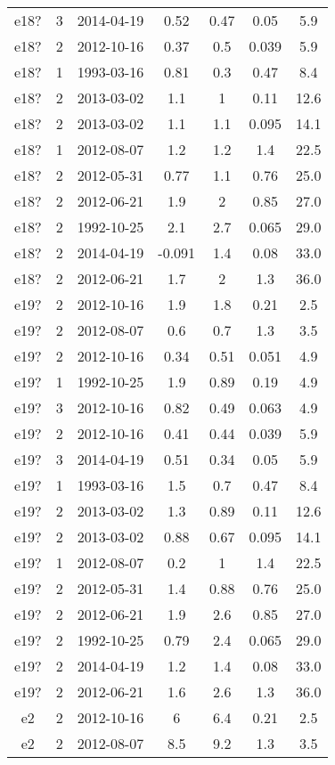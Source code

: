 \begin{table*}[htp]
\begin{tabular}{ccccccc}
e18? & 3 & 2014-04-19 & 0.52 & 0.47 & 0.05 & 5.9 \\
e18? & 2 & 2012-10-16 & 0.37 & 0.5 & 0.039 & 5.9 \\
e18? & 1 & 1993-03-16 & 0.81 & 0.3 & 0.47 & 8.4 \\
e18? & 2 & 2013-03-02 & 1.1 & 1 & 0.11 & 12.6 \\
e18? & 2 & 2013-03-02 & 1.1 & 1.1 & 0.095 & 14.1 \\
e18? & 1 & 2012-08-07 & 1.2 & 1.2 & 1.4 & 22.5 \\
e18? & 2 & 2012-05-31 & 0.77 & 1.1 & 0.76 & 25.0 \\
e18? & 2 & 2012-06-21 & 1.9 & 2 & 0.85 & 27.0 \\
e18? & 2 & 1992-10-25 & 2.1 & 2.7 & 0.065 & 29.0 \\
e18? & 2 & 2014-04-19 & -0.091 & 1.4 & 0.08 & 33.0 \\
e18? & 2 & 2012-06-21 & 1.7 & 2 & 1.3 & 36.0 \\
e19? & 2 & 2012-10-16 & 1.9 & 1.8 & 0.21 & 2.5 \\
e19? & 2 & 2012-08-07 & 0.6 & 0.7 & 1.3 & 3.5 \\
e19? & 2 & 2012-10-16 & 0.34 & 0.51 & 0.051 & 4.9 \\
e19? & 1 & 1992-10-25 & 1.9 & 0.89 & 0.19 & 4.9 \\
e19? & 3 & 2012-10-16 & 0.82 & 0.49 & 0.063 & 4.9 \\
e19? & 2 & 2012-10-16 & 0.41 & 0.44 & 0.039 & 5.9 \\
e19? & 3 & 2014-04-19 & 0.51 & 0.34 & 0.05 & 5.9 \\
e19? & 1 & 1993-03-16 & 1.5 & 0.7 & 0.47 & 8.4 \\
e19? & 2 & 2013-03-02 & 1.3 & 0.89 & 0.11 & 12.6 \\
e19? & 2 & 2013-03-02 & 0.88 & 0.67 & 0.095 & 14.1 \\
e19? & 1 & 2012-08-07 & 0.2 & 1 & 1.4 & 22.5 \\
e19? & 2 & 2012-05-31 & 1.4 & 0.88 & 0.76 & 25.0 \\
e19? & 2 & 2012-06-21 & 1.9 & 2.6 & 0.85 & 27.0 \\
e19? & 2 & 1992-10-25 & 0.79 & 2.4 & 0.065 & 29.0 \\
e19? & 2 & 2014-04-19 & 1.2 & 1.4 & 0.08 & 33.0 \\
e19? & 2 & 2012-06-21 & 1.6 & 2.6 & 1.3 & 36.0 \\
e2 & 2 & 2012-10-16 & 6 & 6.4 & 0.21 & 2.5 \\
e2 & 2 & 2012-08-07 & 8.5 & 9.2 & 1.3 & 3.5 \\

\end{tabular}
\end{table*}
